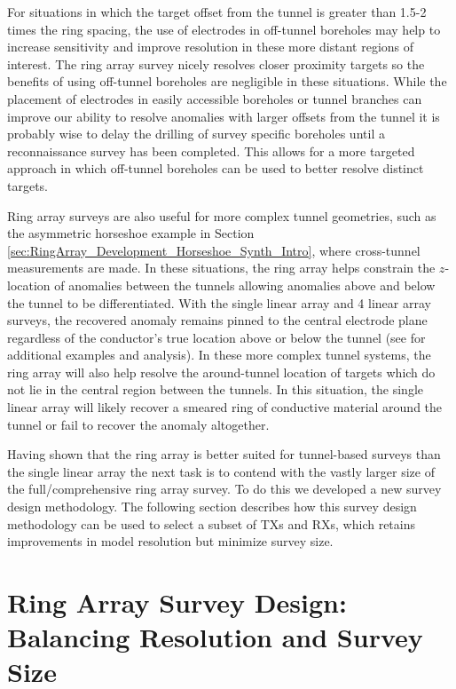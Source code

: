 \documentclass[preprint,authoryear,12pt]{elsarticle}
\begin{document}
For situations in which the target offset from the tunnel is greater than 1.5-2 times the ring spacing, the use of electrodes in off-tunnel boreholes may help to increase sensitivity and improve resolution in these more distant regions of interest. The ring array survey nicely resolves closer proximity targets so the benefits of using off-tunnel boreholes are negligible in these situations. While the placement of electrodes in easily accessible boreholes or tunnel branches can improve our ability to resolve anomalies with larger offsets from the tunnel it is probably wise to delay the drilling of survey specific boreholes until a reconnaissance survey has been completed. This allows for a more targeted approach in which off-tunnel boreholes can be used to better resolve distinct targets.

Ring array surveys are also useful for more complex tunnel geometries, such as the asymmetric horseshoe example in Section \ref{sec:RingArray_Development_Horseshoe_Synth_Intro}, where cross-tunnel measurements are made. In these situations, the ring array helps constrain the $z$-location of anomalies between the tunnels allowing anomalies above and below the tunnel to be differentiated. With the single linear array and 4 linear array surveys, the recovered anomaly remains pinned to the central electrode plane regardless of the conductor's true location above or below the tunnel (see \citet{Mitchell2020} for additional examples and analysis). In these more complex tunnel systems, the ring array will also help resolve the around-tunnel location of targets which do not lie in the central region between the tunnels. In this situation, the single linear array will likely recover a smeared ring of conductive material around the tunnel or fail to recover the anomaly altogether.

Having shown that the ring array is better suited for tunnel-based surveys than the single linear array the next task is to contend with the vastly larger size of the full/comprehensive ring array survey. To do this we developed a new survey design methodology. The following section describes how this survey design methodology can be used to select a subset of TXs and RXs, which retains improvements in model resolution but minimize survey size.

\section{Ring Array Survey Design: Balancing Resolution and Survey Size}
\label{sec:RingArray_SurveyDesign}
\end{document}
